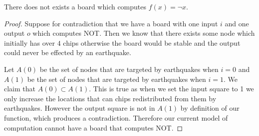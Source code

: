 \documentclass[runningheads,a4paper]{llncs}
\begin{document}
\begin{theorem}
There does not exists a board which computes $f(x) = \neg x$.
\end{theorem}

\begin{proof}
Suppose for contradiction that we have a board with one input $i$ and one output $o$ which computes NOT.  Then we know that there exists some node which initially has over $4$ chips otherwise the board would be stable and the output could never be effected by an earthquake. 

Let $A(0)$ be the set of nodes that are targeted by earthquakes when $i = 0$ and $A(1)$ be the set of nodes that are targeted by earthquakes when $i=1$.  We claim that $A(0) \subset A(1)$. This is true as when we set the input square to 1 we only increase the locations that can chips redistributed from them by earthquakes. However the output square is not in $A(1)$ by definition of our function, which produces a contradiction.  Therefore our current model of computation cannot have a board that computes NOT. 
\end{proof}




\end{document}
